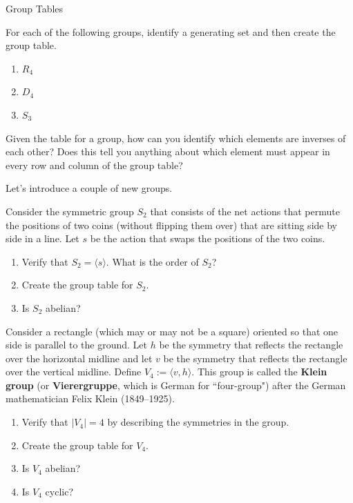 \begin{section}{Group Tables}
\begin{problem}
For each of the following groups, identify a generating set and then create the group table.
\begin{enumerate}[label=\textrm{(\alph*)}]
\item $R_4$
\item $D_4$
\item $S_3$
\end{enumerate}
\end{problem}

\begin{problem}
Given the table for a group, how can you identify which elements are inverses of each other?  Does this tell you anything about which element must appear in every row and column of the group table?
\end{problem}

Let's introduce a couple of new groups.

\begin{problem}\label{prob:introducing_S2}
Consider the symmetric group $S_2$ that consists of the net actions that permute the positions of two coins (without flipping them over) that are sitting side by side in a line.  Let $s$ be the action that swaps the positions of the two coins.
\begin{enumerate}[label=\textrm{(\alph*)}]
\item Verify that $S_2=\langle s\rangle$. What is the order of $S_2$?
\item Create the group table for $S_2$.
\item Is $S_2$ abelian?
\end{enumerate}
\end{problem}

\begin{problem}\label{prob:introducing_V4}
Consider a rectangle (which may or may not be a square) oriented so that one side is parallel to the ground.  Let $h$ be the symmetry that reflects the rectangle over the horizontal midline and let $v$ be the symmetry that reflects the rectangle over the vertical midline. Define $V_4:=\langle v, h\rangle$. This group is called the \textbf{Klein group} (or \textbf{Vierergruppe}, which is German for ``four-group") after the German mathematician Felix Klein (1849--1925).
\begin{enumerate}[label=\textrm{(\alph*)}]
\item Verify that $|V_4|=4$ by describing the symmetries in the group.
\item Create the group table for $V_4$.
\item Is $V_4$ abelian?
\item Is $V_4$ cyclic?
\end{enumerate}
\end{problem}


\end{section}
